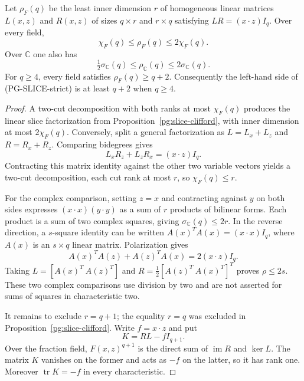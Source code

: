 \begin{proposition}
\label{pg:rectangular-factor}
Let $\rho_F(q)$ be the least inner dimension $r$ of homogeneous
linear matrices $L(x,z)$ and $R(x,z)$ of sizes $q\times r$ and
$r\times q$ satisfying $LR=(x\cdot z)I_q$. Over every field,
\[
 \chi_F(q)\leq\rho_F(q)\leq2\chi_F(q).
\]
Over $\mathbb C$ one also has
\[
 \tfrac12\sigma_{\mathbb C}(q)\leq\rho_{\mathbb C}(q)
 \leq2\sigma_{\mathbb C}(q).
\]
For $q\geq4$, every field satisfies $\rho_F(q)\geq q+2$.
Consequently the left-hand side of (PG-SLICE-strict) is at least
$q+2$ when $q\geq4$.
\end{proposition}
\begin{proof}
A two-cut decomposition with both ranks at most $\chi_F(q)$
produces the linear slice factorization from
Proposition~\ref{pg:slice-clifford}, with inner dimension at most
$2\chi_F(q)$. Conversely, split a general factorization as
$L=L_x+L_z$ and $R=R_x+R_z$. Comparing bidegrees gives
\[
 L_xR_z+L_zR_x=(x\cdot z)I_q.
\]
Contracting this matrix identity against the other two variable
vectors yields a two-cut decomposition, each cut rank at most
$r$, so $\chi_F(q)\leq r$.

For the complex comparison, setting $z=x$ and contracting against
$y$ on both sides expresses
$(x\cdot x)(y\cdot y)$ as a sum of $r$ products of bilinear
forms. Each product is a sum of two complex squares, giving
$\sigma_{\mathbb C}(q)\leq2r$. In the reverse direction, a
$s$-square identity can be written
$A(x)^TA(x)=(x\cdot x)I_q$, where $A(x)$ is an $s\times q$
linear matrix. Polarization gives
\[
 A(x)^TA(z)+A(z)^TA(x)=2(x\cdot z)I_q.
\]
Taking $L=[A(x)^T\ A(z)^T]$ and
$R=\tfrac12[A(z)^T\ A(x)^T]^T$ proves $\rho\leq2s$.
These two complex comparisons use division by two and are not
asserted for sums of squares in characteristic two.

It remains to exclude $r=q+1$; the equality $r=q$ was excluded
in Proposition~\ref{pg:slice-clifford}. Write $f=x\cdot z$ and
put
\[
 K=RL-fI_{q+1}.
\]
Over the fraction field, $F(x,z)^{q+1}$ is the direct sum of
$\operatorname{im}R$ and $\ker L$. The matrix $K$ vanishes on
the former and acts as $-f$ on the latter, so it has rank one.
Moreover $\operatorname{tr}K=-f$ in every characteristic.


\end{proof}
